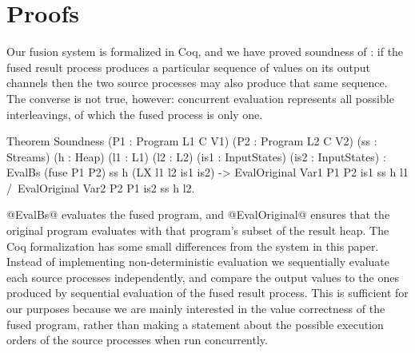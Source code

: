 
\section{Proofs}
\label{s:Proofs}

Our fusion system is formalized in Coq, and we have proved soundness of : if the fused result process produces a particular sequence of values on its output channels then the two source processes may also produce that same sequence. The converse is not true, however: concurrent evaluation represents all possible interleavings, of which the fused process is only one.


\begin{code}
Theorem Soundness 
  (P1 : Program L1 C V1) (P2 : Program L2 C V2)
  (ss : Streams) (h : Heap) (l1 : L1) (l2 : L2)
  (is1 : InputStates) (is2 : InputStates) 
  :  EvalBs (fuse P1 P2) ss h (LX l1 l2 is1 is2)
  -> EvalOriginal Var1 P1 P2 is1 ss h l1
  /\ EvalOriginal Var2 P2 P1 is2 ss h l2.
\end{code}

@EvalBs@ evaluates the fused program, and @EvalOriginal@ ensures that the original program evaluates with that program's subset of the result heap. The Coq formalization has some small differences from the system in this paper. Instead of implementing non-deterministic evaluation we sequentially evaluate each source processes independently, and compare the output values to the ones produced by sequential evaluation of the fused result process. This is sufficient for our purposes because we are mainly interested in the value correctness of the fused program, rather than making a statement about the possible execution orders of the source processes when run concurrently.


